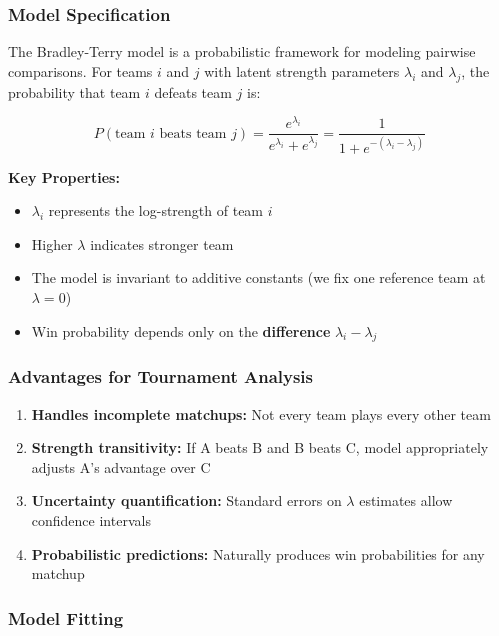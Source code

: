 \documentclass[
]{article}
\providecommand{\tightlist}{%
  \setlength{\itemsep}{0pt}\setlength{\parskip}{0pt}}
\begin{document}
\subsubsection{Model Specification}\label{model-specification}

The Bradley-Terry model is a probabilistic framework for modeling
pairwise comparisons. For teams \(i\) and \(j\) with latent strength
parameters \(\lambda_i\) and \(\lambda_j\), the probability that team
\(i\) defeats team \(j\) is:

\[
P(\text{team } i \text{ beats team } j) = \frac{e^{\lambda_i}}{e^{\lambda_i} + e^{\lambda_j}} = \frac{1}{1 + e^{-(\lambda_i - \lambda_j)}}
\]

\textbf{Key Properties:}

\begin{itemize}
\tightlist
\item
  \(\lambda_i\) represents the log-strength of team \(i\)
\item
  Higher \(\lambda\) indicates stronger team
\item
  The model is invariant to additive constants (we fix one reference
  team at \(\lambda = 0\))
\item
  Win probability depends only on the \textbf{difference}
  \(\lambda_i - \lambda_j\)
\end{itemize}

\subsubsection{Advantages for Tournament
Analysis}\label{advantages-for-tournament-analysis}

\begin{enumerate}
\def\labelenumi{\arabic{enumi}.}
\tightlist
\item
  \textbf{Handles incomplete matchups:} Not every team plays every other
  team
\item
  \textbf{Strength transitivity:} If A beats B and B beats C, model
  appropriately adjusts A's advantage over C
\item
  \textbf{Uncertainty quantification:} Standard errors on \(\lambda\)
  estimates allow confidence intervals
\item
  \textbf{Probabilistic predictions:} Naturally produces win
  probabilities for any matchup
\end{enumerate}

\subsubsection{Model Fitting}\label{model-fitting}
\end{document}

